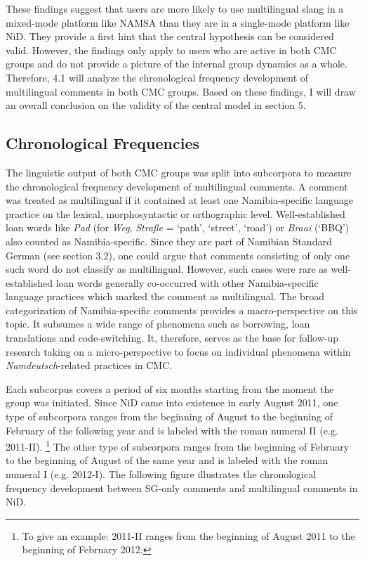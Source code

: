 \documentclass[output=paper]{langsci/langscibook}
\begin{document}
These findings suggest that users are more likely to use multilingual slang in a mixed-mode platform like NAMSA than they are in a single-mode platform like NiD. They provide a first hint that the central hypothesis can be considered valid. However, the findings only apply to users who are active in both CMC groups and do not provide a picture of the internal group dynamics as a whole. Therefore, 4.1 will analyze the chronological frequency development of multilingual comments in both CMC groups. Based on these findings, I will draw an overall conclusion on the validity of the central model in section 5. 

 
   
\subsection{Chronological Frequencies}
 \label{sec:radke:4.2}

The linguistic output of both CMC groups was split into subcorpora to measure the chronological frequency development of multilingual comments. A comment was treated as multilingual if it contained at least one Namibia-specific language practice on the lexical, morphosyntactic or orthographic level. Well-established loan words like \textit{Pad} (for \textit{Weg}, \textit{Straße} = ‘path’, ‘street’, ‘road’) or \textit{Braai} (‘BBQ’) also counted as Namibia-specific. Since they are part of Namibian Standard German (see section 3.2), one could argue that comments consisting of only one such word do not classify as multilingual. However, such cases were rare as well-established loan words generally co-occurred with other Namibia-specific language practices which marked the comment as multilingual. The broad categorization of Namibia-specific comments provides a macro-perspective on this topic. It subsumes a wide range of phenomena such as borrowing, loan translations and code-switching. It, therefore, serves as the base for follow-up research taking on a micro-perspective to focus on individual phenomena within \textit{Namdeutsch}-related practices in CMC. 

Each subcorpus covers a period of six months starting from the moment the group was initiated. Since NiD came into existence in early August 2011, one type of subcorpora ranges from the beginning of August to the beginning of February of the following year and is labeled with the roman numeral II (e.g. 2011-II). \footnote{To give an example: 2011-II ranges from the beginning of August 2011 to the beginning of February 2012.} The other type of subcorpora ranges from the beginning of February to the beginning of August of the same year and is labeled with the roman numeral I (e.g. 2012-I). The following figure illustrates the chronological frequency development between SG-only comments and multilingual comments in NiD. 
\end{document}
